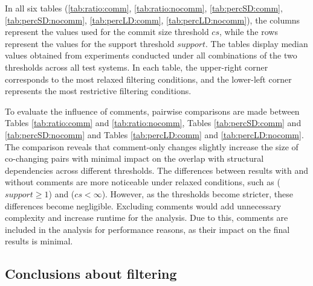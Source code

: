 In all six tables (\ref{tab:ratio:comm}, \ref{tab:ratio:nocomm}, \ref{tab:percSD:comm}, \ref{tab:percSD:nocomm}, \ref{tab:percLD:comm}, \ref{tab:percLD:nocomm}), the columns represent the values used for the commit size threshold $cs$, while the rows represent the values for the support threshold $support$. The tables display median values obtained from experiments conducted under all combinations of the two thresholds across all test systems. In each table, the upper-right corner corresponds to the most relaxed filtering conditions, and the lower-left corner represents the most restrictive filtering conditions.

To evaluate the influence of comments, pairwise comparisons are made between Tables \ref{tab:ratio:comm} and \ref{tab:ratio:nocomm}, Tables \ref{tab:percSD:comm} and \ref{tab:percSD:nocomm} and Tables \ref{tab:percLD:comm} and \ref{tab:percLD:nocomm}. 
The comparison reveals that comment-only changes slightly increase the size of co-changing pairs with minimal impact on the overlap with structural dependencies across different thresholds. The differences between results with and without comments are more noticeable under relaxed conditions, such as ($support \geq 1$) and ($cs < \infty$). However, as the thresholds become stricter, these differences become negligible.
Excluding comments would add unnecessary complexity and increase runtime for the analysis. Due to this, comments are included in the analysis for performance reasons, as their impact on the final results is minimal.



\subsection{Conclusions about filtering}
\label{filtering_recomandations}

